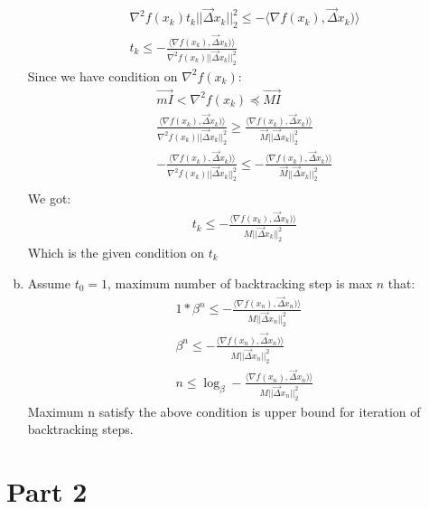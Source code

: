 \documentclass[12pt,twoside]{article}
\begin{document}
\begin{enumerate}[a)]
\begin{align}
\nabla^2 f(x_k)t_k||\vec{\Delta}x_k||_2^2 \leq - \langle\nabla f(x_k), \vec{\Delta}x_k)\rangle\\
t_k \leq - \frac{\langle\nabla f(x_k), \vec{\Delta}x_k)\rangle}{\nabla^2 f(x_k)||\vec{\Delta}x_k||_2^2}
\end{align}
Since we have condition on $\nabla^2 f(x_k)$:
\begin{align}
\vec{mI} <  \nabla^2 f(x_k) \preceq \vec{MI}\\
\frac{\langle\nabla f(x_k), \vec{\Delta}x_k)\rangle}{\nabla^2 f(x_k)||\vec{\Delta}x_k||_2^2} \geq \frac{\langle\nabla f(x_k), \vec{\Delta}x_k)\rangle}{\vec{M}||\vec{\Delta}x_k||_2^2}\\
- \frac{\langle\nabla f(x_k), \vec{\Delta}x_k)\rangle}{\nabla^2 f(x_k)||\vec{\Delta}x_k||_2^2} \leq - \frac{\langle\nabla f(x_k), \vec{\Delta}x_k)\rangle}{\vec{M}||\vec{\Delta}x_k||_2^2}\\
\end{align}
We got:
\begin{align}
t_k \leq - \frac{\langle\nabla f(x_k), \vec{\Delta}x_k)\rangle}{M||\vec{\Delta}x_k||_2^2}
\end{align}
Which is the given condition on $t_k$\\

\item
Assume $t_0 = 1$, maximum number of backtracking step is max $n$ that:
\begin{align}
1 * \beta^n \leq - \frac{\langle\nabla f(x_n), \vec{\Delta}x_n)\rangle}{M||\vec{\Delta}x_n||_2^2}\\
\beta^n \leq - \frac{\langle\nabla f(x_n), \vec{\Delta}x_n)\rangle}{M||\vec{\Delta}x_n||_2^2}\\
n \leq \log_\beta - \frac{\langle\nabla f(x_n), \vec{\Delta}x_n)\rangle}{M||\vec{\Delta}x_n||_2^2}
\end{align}
Maximum n satisfy the above condition is upper bound for iteration of backtracking steps.




\end{enumerate}

\section{Part 2}
\end{document}
